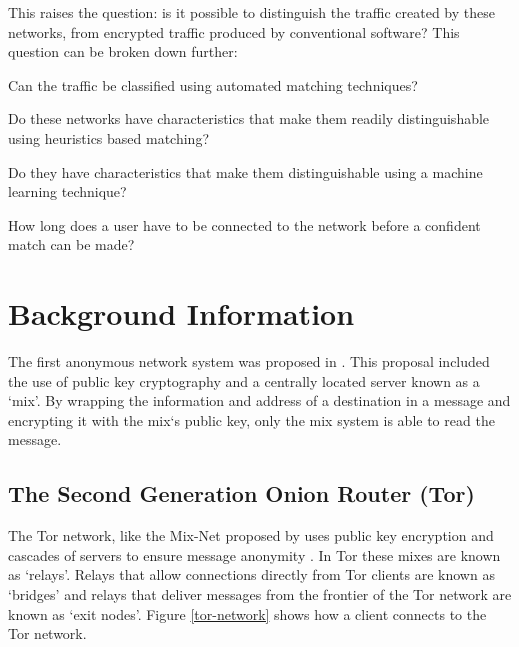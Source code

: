 \documentclass{conference}
\begin{document}
This raises the question: is it possible to distinguish the traffic created by these networks, from encrypted traffic produced by conventional software? This question can be broken down further:

\begin{enumerate*}
\item Can the traffic be classified using automated matching techniques?
\item Do these networks have characteristics that make them readily distinguishable using heuristics based matching?
\item Do they have characteristics that make them distinguishable using a machine learning technique?
\item How long does a user have to be connected to the network before a confident match can be made?
\end{enumerate*}

\section{Background Information}

The first anonymous network system was proposed in \citet{Chaum:1981p296}. This proposal included the use of public key cryptography and a centrally located server known as a `mix'. By wrapping the information and address of a destination in a message and encrypting it with the mix`s public key, only the mix system is able to read the message.

\subsection{The Second Generation Onion Router (Tor)}

The Tor network, like the Mix-Net proposed by \citet{Chaum:1981p296} uses public key encryption and cascades of servers to ensure message anonymity \citep{Dingledine:2004p314}. In Tor these mixes are known as ‘relays’. Relays that allow connections directly from Tor clients are known as ‘bridges’ and relays that deliver messages from the frontier of the Tor network are known as ‘exit nodes’. Figure \ref{tor-network} shows how a client connects to the Tor network.
\end{document}
